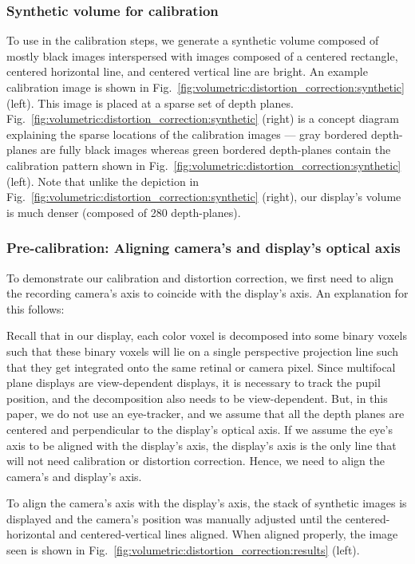 \subsubsection{Synthetic volume for calibration}
To use in the calibration steps, we generate a synthetic volume composed of mostly black images interspersed with images composed of a centered rectangle, centered horizontal line, and centered vertical line are bright.
An example calibration image is shown in Fig.~\ref{fig:volumetric:distortion_correction:synthetic} (left). This image is placed at a sparse set of depth planes. Fig.~\ref{fig:volumetric:distortion_correction:synthetic} (right) is a concept diagram explaining the sparse locations of the calibration images --- gray bordered depth-planes are fully black images whereas green bordered depth-planes contain the calibration pattern shown in Fig.~\ref{fig:volumetric:distortion_correction:synthetic} (left). Note that unlike the depiction in Fig.~\ref{fig:volumetric:distortion_correction:synthetic} (right), our display's volume is much denser (composed of 280 depth-planes). 

\subsubsection{Pre-calibration: Aligning camera's and display's optical axis}
To demonstrate our calibration and distortion correction, we first need to align the recording camera's axis to coincide with the display's axis. An explanation for this follows:

Recall that in our display, each color voxel is decomposed into some binary voxels such that these binary voxels will lie on a single perspective projection line such that they get integrated onto the same retinal or camera pixel. 
Since multifocal plane displays are view-dependent displays, it is necessary to track the pupil position, and the decomposition also needs to be view-dependent.
But, in this paper, we do not use an eye-tracker, and we assume that all the depth planes are centered and perpendicular to the display's optical axis.
If we assume the eye's axis to be aligned with the display's axis, the display's axis is the only line that will not need calibration or distortion correction. Hence, we need to align the camera's and display's axis.

To align the camera's axis with the display's axis, the stack of synthetic images is displayed and the camera's position was manually adjusted until the centered-horizontal and centered-vertical lines aligned. When aligned properly, the image seen is shown in Fig.~\ref{fig:volumetric:distortion_correction:results} (left).


